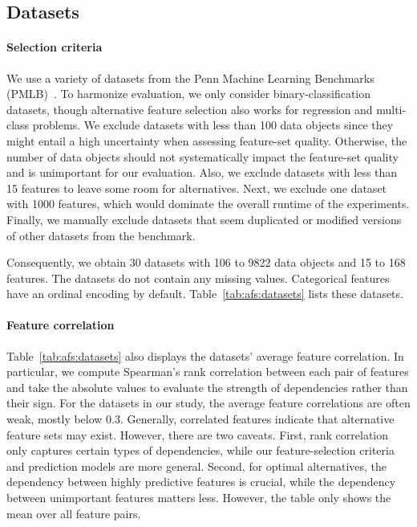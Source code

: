 \documentclass{article}
\theoremstyle{definition}
\begin{document}
\subsection{Datasets}
\label{sec:afs:experimental-design:datasets}

\paragraph{Selection criteria}

We use a variety of datasets from the Penn Machine Learning Benchmarks (PMLB)~\cite{olson2017pmlb,romano2021pmlb}.
To harmonize evaluation, we only consider binary-classification datasets, though alternative feature selection also works for regression and multi-class problems.
We exclude datasets with less than 100 data objects since they might entail a high uncertainty when assessing feature-set quality.
Otherwise, the number of data objects should not systematically impact the feature-set quality and is unimportant for our evaluation.
Also, we exclude datasets with less than 15 features to leave some room for alternatives.
Next, we exclude one dataset with 1000 features, which would dominate the overall runtime of the experiments.
Finally, we manually exclude datasets that seem duplicated or modified versions of other datasets from the benchmark.

Consequently, we obtain 30 datasets with 106 to 9822 data objects and 15 to 168 features.
The datasets do not contain any missing values.
Categorical features have an ordinal encoding by default.
Table~\ref{tab:afs:datasets} lists these datasets.

\paragraph{Feature correlation}

Table~\ref{tab:afs:datasets} also displays the datasets' average feature correlation.
In particular, we compute Spearman's rank correlation between each pair of features and take the absolute values to evaluate the strength of dependencies rather than their sign.
For the datasets in our study, the average feature correlations are often weak, mostly below 0.3.
Generally, correlated features indicate that alternative feature sets may exist.
However, there are two caveats.
First, rank correlation only captures certain types of dependencies, while our feature-selection criteria and prediction models are more general.
Second, for optimal alternatives, the dependency between highly predictive features is crucial, while the dependency between unimportant features matters less.
However, the table only shows the mean over all feature pairs.
\end{document}
